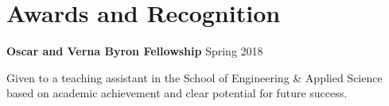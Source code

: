 \pagestyle{plain}
\chapter[Awards and Recognition][Awards and Recognition]{Awards and Recognition}

\textbf{Oscar and Verna Byron Fellowship} \hfill Spring 2018

Given to a teaching assistant in the School of Engineering \& Applied Science based on academic achievement and clear potential for future success.